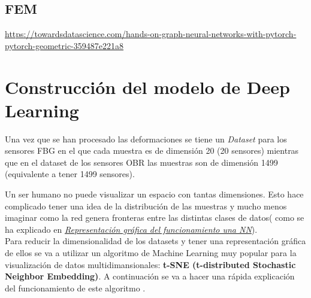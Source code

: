     
    
\subsection{FEM}
    
    
    

\url{https://towardsdatascience.com/hands-on-graph-neural-networks-with-pytorch-pytorch-geometric-359487e221a8}



\clearpage

\section{Construcción del modelo de Deep Learning}

Una vez que se han procesado las deformaciones se tiene un \textit{Dataset} para los sensores FBG en el que cada muestra es de dimensión 20 (20 sensores) mientras que en el dataset de los sensores OBR las muestras son de dimensión 1499 (equivalente a tener 1499 sensores).

Un ser humano no puede visualizar un espacio con tantas dimensiones. Esto hace complicado tener una idea de la distribución de las muestras y mucho menos imaginar como la red genera fronteras entre las distintas clases de datos( como se ha explicado en \hyperref[sec:funcionamiento_DL]{\textit{Representación gráfica del funcionamiento una NN}}).\\

Para reducir la dimensionalidad de los datasets y tener una representación gráfica de ellos se va a utilizar un algoritmo de Machine Learning muy popular para la visualización de datos multidimansionales: \textbf{t-SNE (t-distributed Stochastic Neighbor Embedding)}. A continuación se va a hacer una rápida explicación del funcionamiento de este algoritmo \cite{t_sne}.\\

